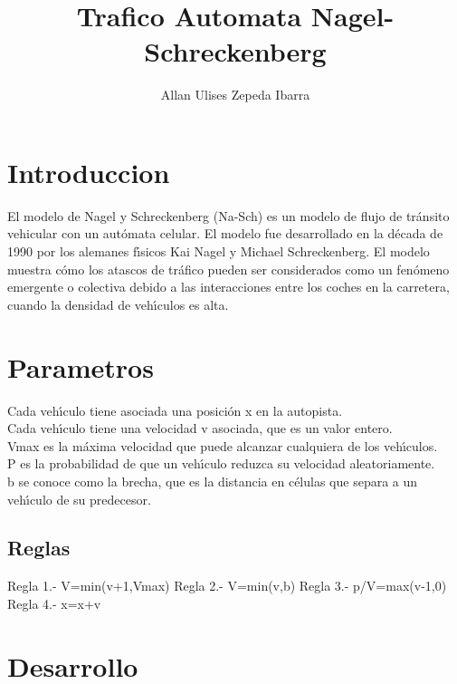 \documentclass[a4paper,10pt]{article}
\title{Trafico Automata Nagel-Schreckenberg}
\author{Allan Ulises Zepeda Ibarra}
\begin{document}
\maketitle



\section{Introduccion}

El modelo de Nagel y Schreckenberg (Na-Sch) es un modelo de flujo de tr\'ansito vehicular con un aut\'omata celular. 
El modelo fue desarrollado en la d\'ecada de 1990 por los alemanes f\'\i sicos Kai Nagel y Michael Schreckenberg.
El modelo muestra c\'omo los atascos de tr\'afico pueden ser considerados como un fen\'omeno emergente o colectiva debido a las 
interacciones entre los coches en la carretera, cuando la densidad de veh\'\i culos es alta.

\section{Parametros}

Cada veh\'\i culo tiene asociada una posici\'on x en la autopista.\\
Cada veh\'\i culo tiene una velocidad v asociada, que es un valor entero.\\
Vmax es la m\'axima velocidad que puede alcanzar cualquiera de los veh\'\i culos.\\
P es la probabilidad de que un veh\'\i culo reduzca su velocidad aleatoriamente.\\
b se conoce como la brecha, que es la distancia en c\'elulas que separa a un veh\'\i culo de su predecesor.\\

\subsection{Reglas}

Regla 1.- V=min(v+1,Vmax)
Regla 2.- V=min(v,b)
Regla 3.- p/V=max(v-1,0)
Regla 4.- x=x+v

\section{Desarrollo}
\end{document}
